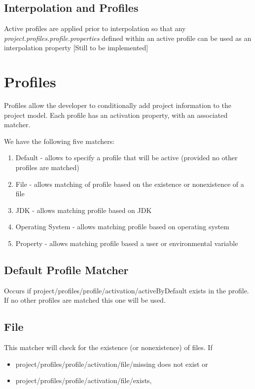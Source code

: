 \documentclass[12pt]{amsart}
\begin{document}
\subsection{Interpolation and Profiles}
Active profiles are applied prior to interpolation so that any \emph{project.profiles.profile.properties} defined within an active profile can be used as an interpolation property [Still to be implemented]

\section{Profiles}
Profiles allow the developer to conditionally add project information to the project model. Each profile has an activation property, with an associated matcher.

We have the following five matchers:
\begin{enumerate}
\item Default - allows to specify a profile that will be active (provided no other profiles are matched)
\item File - allows matching of profile based on the existence or nonexistence of a file
\item JDK - allows matching profile based on JDK
\item Operating System - allows matching profile based on operating system
\item Property - allows matching profile based a user or environmental variable
\end{enumerate}

\subsection{Default Profile Matcher}
Occurs if 
project/profiles/profile/activation/activeByDefault 
exists in the profile. If no other profiles are matched this one will be used.

\subsection{File}
This matcher will check for the existence (or nonexistence) of files. If 
\begin{itemize}
\item project/profiles/profile/activation/file/missing does not exist or
\item project/profiles/profile/activation/file/exists, 
\end{itemize}
\end{document}
